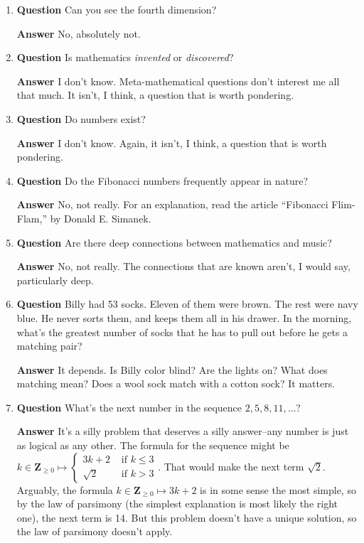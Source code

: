 \documentclass[12pt]{article}
\newcounter{ex}\setcounter{ex}{0}
\begin{document}
\begin{enumerate}
\item  \textbf{Question}  Can you see the fourth dimension?

\textbf{Answer} No, absolutely not.

\item  \textbf{Question}  Is mathematics \emph{invented} or \emph{discovered}?

 \textbf{Answer} I don't know. Meta-mathematical questions don't interest me all that much. 
It isn't, I think, a question that is worth pondering.

\item  \textbf{Question} Do numbers exist?

  \textbf{Answer} I don't know. Again, it isn't, I think, a question that is worth pondering.

\item  \textbf{Question} Do the Fibonacci numbers frequently appear in nature?

\textbf{Answer}  No, not really.  For an explanation, read the article ``Fibonacci Flim-Flam,'' by Donald E. Simanek.

\item  \textbf{Question} Are there deep connections between mathematics and music? 

  \textbf{Answer}  No, not really. The connections that are known aren't, I would say, particularly deep.

\item  \textbf{Question}  Billy had 53 socks.  Eleven of them were brown.  The rest were navy blue.  He never sorts them, and keeps them all in his drawer.  In the morning, what's the greatest number of socks that he has to pull out before he gets a matching pair?

  \textbf{Answer} It depends. Is Billy color blind?  Are the lights on? What does matching mean? Does a wool sock match with a cotton sock? It matters.

\item  \textbf{Question} What's the next number in the sequence  \(2,5,8,11, \dots \)?

  \textbf{Answer}  It's a silly problem that deserves a silly answer--any number is just as logical as any other. 
The formula for the sequence might be \(k \in \mathbf{Z}_{\geq 0} \mapsto \begin{cases} 3 k +2 & \mbox{ if } k \leq 3
 \\ \sqrt{2} & \mbox{ if } k >  3 \end{cases} \). That would make the next term \(\sqrt{2} \). 
 Arguably, the formula  \(k \in \mathbf{Z}_{\geq 0}  \mapsto 3 k +2 \) is in some 
 sense the most simple, so by the law of parsimony 
 (the simplest explanation is most likely the right one), the next term is 14.  
 But this problem doesn't have a unique solution, so the law of parsimony doesn't apply.


\end{enumerate}
\end{document}

